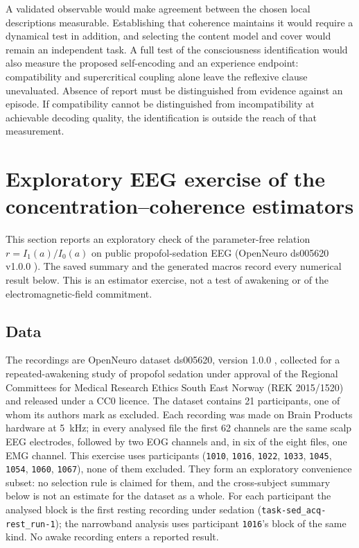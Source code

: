 \documentclass{article}
\renewcommand{\cite}[1]{\citep{#1}}
\begin{document}
A validated observable would make agreement between the chosen local descriptions measurable. Establishing that coherence maintains it would require a dynamical test in addition, and selecting the content model and cover would remain an independent task. A full test of the consciousness identification would also measure the proposed self-encoding and an experience endpoint: compatibility and supercritical coupling alone leave the reflexive clause unevaluated. Absence of report must be distinguished from evidence against an episode. If compatibility cannot be distinguished from incompatibility at achievable decoding quality, the identification is outside the reach of that measurement.

\section{Exploratory EEG exercise of the concentration--coherence estimators}
\label{sec:supp-eeg}
\label{sec:empirical-methods}

This section reports an exploratory check of the parameter-free relation $r = I_1(a)/I_0(a)$ on public propofol-sedation EEG (OpenNeuro ds005620 v1.0.0 \cite{bajwa2024data,bajwa2025}). The saved summary and the generated macros record every numerical result below. This is an estimator exercise, not a test of awakening or of the electromagnetic-field commitment.

\subsection{Data}

The recordings are OpenNeuro dataset ds005620, version 1.0.0 \cite{bajwa2024data}, collected for a repeated-awakening study of propofol sedation \cite{bajwa2025} under approval of the Regional Committees for Medical Research Ethics South East Norway (REK 2015/1520) and released under a CC0 licence. The dataset contains 21 participants, one of whom its authors mark as excluded. Each recording was made on Brain Products hardware at 5~kHz; in every analysed file the first 62 channels are the same scalp EEG electrodes, followed by two EOG channels and, in six of the eight files, one EMG channel. This exercise uses \eegCrossSubjectCount{} participants (\texttt{1010}, \texttt{1016}, \texttt{1022}, \texttt{1033}, \texttt{1045}, \texttt{1054}, \texttt{1060}, \texttt{1067}), none of them excluded. They form an exploratory convenience subset: no selection rule is claimed for them, and the cross-subject summary below is not an estimate for the dataset as a whole. For each participant the analysed block is the first resting recording under sedation (\texttt{task-sed\_acq-rest\_run-1}); the narrowband analysis uses participant \texttt{1016}'s block of the same kind. No awake recording enters a reported result.
\end{document}
